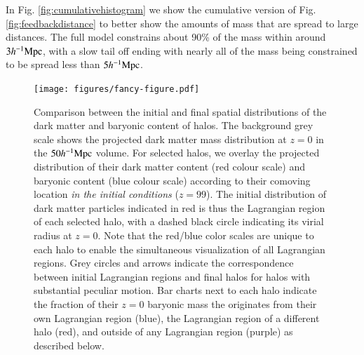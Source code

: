 In Fig. \ref{fig:cumulativehistogram} we show the cumulative version of Fig.
\ref{fig:feedbackdistance} to better show the amounts of mass that are spread
to large distances. The full model constrains about 90\% of the mass within
around $3h^{-1}{\rm Mpc}{}$, with a slow tail off ending with nearly all of the mass
being constrained to be spread less than $5h^{-1}{\rm Mpc}{}$.

\begin{figure}
	\centering
	\vspace{0.5cm}
	\texttt{[image: figures/fancy-figure.pdf]}
  \caption{ %
  Comparison between the initial and final spatial distributions of the dark matter and baryonic content of halos.
  The background grey scale shows the projected dark matter mass distribution at $z=0$ in the $50h^{-1}{\rm Mpc}{}$ \simba{} volume. For selected halos, we overlay the projected distribution of their dark matter content (red colour scale) and baryonic content (blue colour scale) according to their comoving location \emph{in the initial conditions} ($z=99$). The initial distribution of dark matter particles indicated in red is thus the Lagrangian region of each selected halo, with a dashed black circle indicating its virial radius at $z=0$.
  Note that the red/blue color scales are unique to each halo to enable the simultaneous visualization of all Lagrangian regions. 
  Grey circles and arrows indicate the correspondence between initial Lagrangian regions and final halos for halos with substantial peculiar motion. 
  Bar charts next to each halo indicate the fraction of their $z=0$ baryonic mass the originates from their own Lagrangian region (blue), the Lagrangian region of a different halo (red), and outside of any Lagrangian region (purple) as described below.
}
\end{figure}
